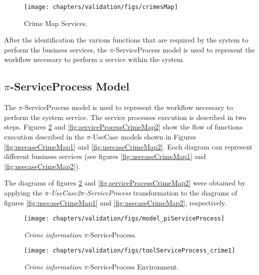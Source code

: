 \begin{figure}[ht!]   
\centering
\texttt{[image: chapters/validation/figs/crimesMap]}
\caption{Crime Map Services.}
\label{fig:servicesCrimeMap}
\end{figure}
 
After the identification the various functions that are required by the system
to perform the business services, the $\pi$-ServiceProcess model is used to
represent the workflow necessary to perform a service within the system.
 
 
\subsection{$\pi$-ServiceProcess Model}
\label{sec:serviceprocess_crimesMap} 

The $\pi$-ServiceProcess model is used to represent the workflow necessary to
perform the system service. The service processes execution is described in two
steps. Figures \ref{fig:serviceProcessCrimeMap} and \ref{fig:serviceProcessCrimeMap2} show the
flow of functions execution described in the $\pi$-UseCase models shown
in Figures \ref{fig:usecaseCrimeMap1} and \ref{fig:usecaseCrimeMap2}. Each
diagram can represent different business services (see figures
\ref{fig:usecaseCrimeMap1} and \ref{fig:usecaseCrimeMap2}).

The diagrams of figures \ref{fig:serviceProcessCrimeMap} and
\ref{fig:serviceProcessCrimeMap2} were obtained by applying the
\textit{$\pi$-UseCase2$\pi$-ServiceProcess} transformation to the diagrams of
figures \ref{fig:usecaseCrimeMap1} and \ref{fig:usecaseCrimeMap2}, respectively.  


\begin{figure}[ht!]   
\centering
\texttt{[image: chapters/validation/figs/model\_piServiceProcess]}
\caption{\textit{Crime information} $\pi$-ServiceProcess.}
\label{fig:serviceProcessCrimeMap}
\end{figure}  

\begin{figure}[ht!]    
\centering
\texttt{[image: chapters/validation/figs/toolServiceProcess\_crime1]}
\caption{\textit{Crime information}
$\pi$-ServiceProcess Environment.}
\label{fig:toolserviceProcessCrimeMap}
\end{figure} 

